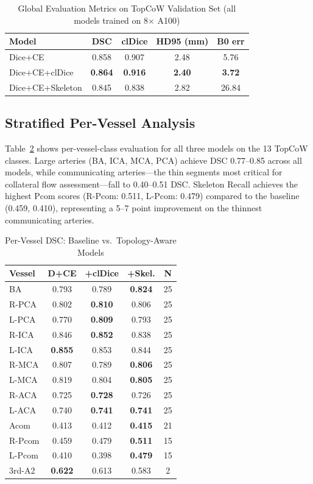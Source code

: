 \documentclass[conference]{IEEEtran}
\begin{document}
\begin{table}[t]
\centering
\caption{Global Evaluation Metrics on TopCoW Validation Set (all models trained on 8$\times$ A100)}
\label{tab:global}
\begin{tabular}{lcccc}
\toprule
\textbf{Model} & \textbf{DSC} & \textbf{clDice} & \textbf{HD95 (mm)} & \textbf{B0 err} \\
\midrule
Dice+CE          & 0.858 & 0.907 & 2.48 & 5.76 \\
Dice+CE+clDice   & \textbf{0.864} & \textbf{0.916} & \textbf{2.40} & \textbf{3.72} \\
Dice+CE+Skeleton & 0.845 & 0.838 & 2.82 & 26.84 \\
\bottomrule
\end{tabular}
\end{table}

\subsection{Stratified Per-Vessel Analysis}

Table~\ref{tab:stratified} shows per-vessel-class evaluation for all three models on the 13 TopCoW classes. Large arteries (BA, ICA, MCA, PCA) achieve DSC 0.77--0.85 across all models, while communicating arteries---the thin segments most critical for collateral flow assessment---fall to 0.40--0.51 DSC. Skeleton Recall achieves the highest Pcom scores (R-Pcom: 0.511, L-Pcom: 0.479) compared to the baseline (0.459, 0.410), representing a 5--7 point improvement on the thinnest communicating arteries.

\begin{table}[t]
\centering
\caption{Per-Vessel DSC: Baseline vs.\ Topology-Aware Models}
\label{tab:stratified}
\begin{tabular}{lcccc}
\toprule
\textbf{Vessel} & \textbf{D+CE} & \textbf{+clDice} & \textbf{+Skel.} & \textbf{N} \\
\midrule
BA      & 0.793 & 0.789 & \textbf{0.824} & 25 \\
R-PCA   & 0.802 & \textbf{0.810} & 0.806 & 25 \\
L-PCA   & 0.770 & \textbf{0.809} & 0.793 & 25 \\
R-ICA   & 0.846 & \textbf{0.852} & 0.838 & 25 \\
L-ICA   & \textbf{0.855} & 0.853 & 0.844 & 25 \\
R-MCA   & 0.807 & 0.789 & \textbf{0.806} & 25 \\
L-MCA   & 0.819 & 0.804 & \textbf{0.805} & 25 \\
R-ACA   & 0.725 & \textbf{0.728} & 0.726 & 25 \\
L-ACA   & 0.740 & \textbf{0.741} & \textbf{0.741} & 25 \\
\midrule
Acom    & 0.413 & 0.412 & \textbf{0.415} & 21 \\
R-Pcom  & 0.459 & 0.479 & \textbf{0.511} & 15 \\
L-Pcom  & 0.410 & 0.398 & \textbf{0.479} & 15 \\
3rd-A2  & \textbf{0.622} & 0.613 & 0.583 & 2 \\
\bottomrule
\end{tabular}
\end{table}
\end{document}
